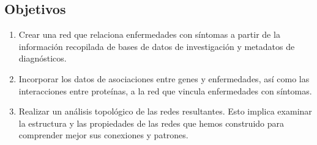 \subsection{Objetivos}
\begin{enumerate}
	\item Crear una red que relaciona enfermedades con síntomas a partir de la información recopilada de bases de datos de investigación y metadatos de diagnósticos.
	
	\item Incorporar los datos de asociaciones entre genes y enfermedades, así como las interacciones entre proteínas, a la red que vincula enfermedades con síntomas.
	\item Realizar un análisis topológico de las redes resultantes. Esto implica examinar la estructura y las propiedades de las redes que hemos construido para comprender mejor sus conexiones y patrones.
	
\end{enumerate}
